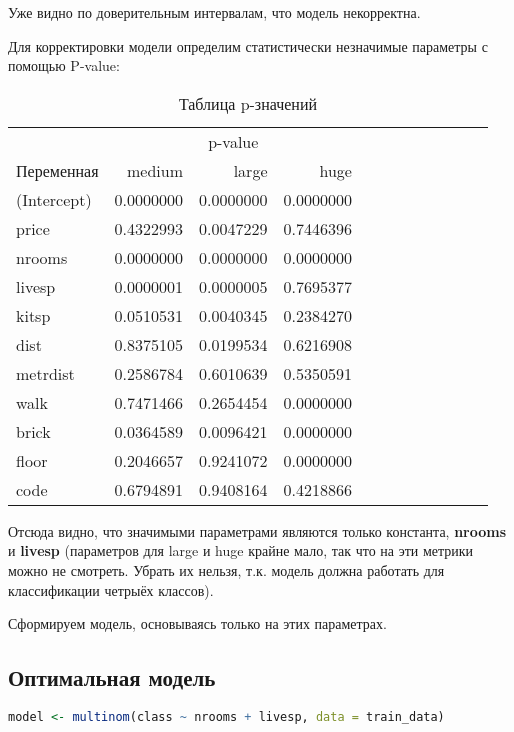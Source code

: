 \newpage 
Уже видно по доверительным интервалам, что модель некорректна.

Для корректировки модели определим статистически незначимые параметры с помощью P-value:


\begin{table}[h]
	\centering
	\caption{Таблица p-значений}
	\begin{tabular}{|l|r|r|r|rrrrrrrr}
		\toprule
		& \multicolumn{3}{|c|}{p-value} \\
		\cmidrule(lr){2-4}
		Переменная & medium & large & huge \\
		\midrule
		(Intercept) & 0.0000000 & 0.0000000 & 0.0000000 \\
		price & 0.4322993 & 0.0047229 & 0.7446396 \\
		nrooms & 0.0000000 & 0.0000000 & 0.0000000 \\
		livesp & 0.0000001 & 0.0000005 & 0.7695377 \\
		kitsp & 0.0510531 & 0.0040345 & 0.2384270 \\
		dist & 0.8375105 & 0.0199534 & 0.6216908 \\
		metrdist & 0.2586784 & 0.6010639 & 0.5350591 \\
		walk & 0.7471466 & 0.2654454 & 0.0000000 \\
		brick & 0.0364589 & 0.0096421 & 0.0000000 \\
		floor & 0.2046657 & 0.9241072 & 0.0000000 \\
		code & 0.6794891 & 0.9408164 & 0.4218866 \\
		\bottomrule
	\end{tabular}
\end{table}

Отсюда видно, что значимыми параметрами являются только константа, \textbf{nrooms} и \textbf{livesp} (параметров для large и huge крайне мало, так что на эти метрики можно не смотреть. Убрать их нельзя, т.к. модель должна работать для классификации четрыёх классов). 

Сформируем модель, основываясь только на этих параметрах. 

\subsection{Оптимальная модель}
\begin{lstlisting}[language=R, caption={Построение оптимальной модели}]
model <- multinom(class ~ nrooms + livesp, data = train_data)
\end{lstlisting}
\newpage

